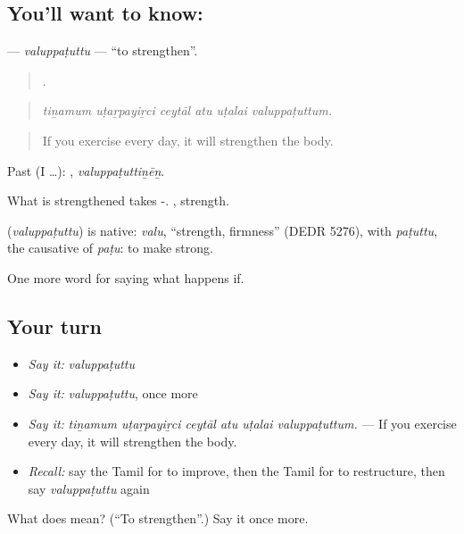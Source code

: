 \subsection*{You'll want to know: }
\textbf{} — \emph{valuppaṭuttu} — \textquotedblleft{}to strengthen\textquotedblright{}.

\begin{quote}
     .
\end{quote}

\begin{quote}
\emph{tiṉamum uṭaṟpayiṟci ceytāl atu uṭalai valuppaṭuttum.}
\end{quote}

\begin{quote}
If you exercise every day, it will strengthen the body.
\end{quote}

Past (I …): , \emph{valuppaṭuttiṉēṉ}.

What is strengthened takes -. , strength.

\begin{cousinweb}
\textbf{} (\emph{valuppaṭuttu}) is native: \emph{valu}, \textquotedblleft{}strength, firmness\textquotedblright{} (DEDR 5276), with \emph{paṭuttu}, the causative of \emph{paṭu}: to make strong.
\end{cousinweb}

\begin{grammarlens}[title={What you've built}]
One more word for saying what happens if.
\end{grammarlens}

\subsection*{Your turn}
\begin{itemize}
\raggedright
  \item \emph{Say it:} \emph{valuppaṭuttu}
  \item \emph{Say it:} \emph{valuppaṭuttu}, once more
  \item \emph{Say it:} \emph{tiṉamum uṭaṟpayiṟci ceytāl atu uṭalai valuppaṭuttum.} — If you exercise every day, it will strengthen the body.
  \item \emph{Recall:} say the Tamil for to improve, then the Tamil for to restructure, then say \emph{valuppaṭuttu} again
\end{itemize}

\begin{tcolorbox}[breakable,colback=teal!4,colframe=teal!35!black,title={Before you move on}]
What does  mean? (\textquotedblleft{}To strengthen\textquotedblright{}.) Say it once more.
\end{tcolorbox}
